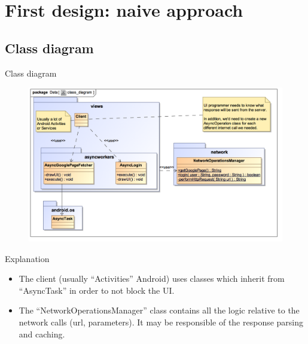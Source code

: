 \documentclass{beamer}
\begin{document}
\section{First design: naive approach}
\subsection{Class diagram}
\begin{frame}{Class diagram}
\begin{figure}
\begin{center}
\includegraphics[scale=0.6]{../naive/design_models/class_diagram}
\end{center}
\end{figure}
\end{frame}

\begin{frame}{Explanation}
\begin{itemize}
\item The client (usually ``Activities'' Android) uses classes which inherit from ``AsyncTask'' in order to not block the UI.
\item The ``NetworkOperationsManager'' class contains all the logic relative to the network calls (url, parameters). It may be responsible of the response parsing and caching.
\end{itemize}
\end{frame}
\end{document}
